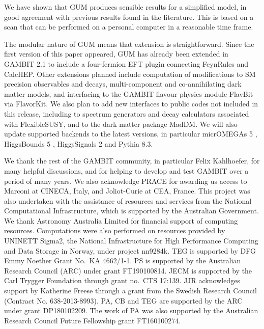 \documentclass[pdftex,twocolumn,epjc3_preprint,runningheads]{svjour3}
\renewcommand{\_}{\discretionary{\underscore}{}{\underscore}}
\newcommand{\gambit}{\textsf{GAMBIT}\xspace}
\newcommand{\flavbit}{\textsf{FlavBit}\xspace}
\newcommand{\GB}{\gambit}
\newcommand{\pythia}{\textsf{Pythia}\xspace}
\newcommand{\higgsbounds}{\textsf{HiggsBounds}\xspace}
\newcommand{\higgssignals}{\textsf{HiggsSignals}\xspace}
\newcommand{\mo}{\micromegas}
\newcommand{\micromegas}{\textsf{micrOMEGAs}\xspace}
\newcommand\FS{\FlexibleSUSY}
\newcommand\FlexibleSUSY{\textsf{FlexibleSUSY}\xspace}
\newcommand{\gum}{\textsf{GUM}\xspace}
\newcommand{\fr}{\textsf{FeynRules}\xspace}
\newcommand{\CH}{\textsf{CalcHEP}\xspace}
\newcommand{\mdm}{\textsf{MadDM}\xspace}
\begin{document}
We have shown that \gum produces sensible results for a simplified model, in good agreement with previous results found in the literature.  This is based on a scan that can be performed on a personal computer in a reasonable time frame.

The modular nature of \gum means that extension is straightforward.  Since the first version of this paper appeared, \gum has already been extended in \gambit 2.1 to include a four-fermion EFT plugin connecting \fr and \CH \cite{DMEFT}.  Other extensions planned include computation of modifications to SM precision observables and decays, multi-component and co-annihilating dark matter models, and interfacing to the \GB flavour physics module \flavbit via \textsf{FlavorKit}.  We also plan to add new interfaces to public codes not included in this release, including to spectrum generators and decay calculators associated with \FS, and to the dark matter package \mdm. We will also update supported backends to the latest versions, in particular \mo 5 \cite{Belanger:2018ccd}, \higgsbounds 5 \cite{Bechtle:2020pkv}, \higgssignals 2 \cite{Bechtle:2020uwn} and \pythia 8.3.


\begin{acknowledgements}
We thank the rest of the GAMBIT community, in particular Felix Kahlhoefer, for many helpful discussions, and for helping to develop and test \GB over a period of many years. We also acknowledge PRACE for awarding us access to Marconi at CINECA, Italy, and Joliot-Curie at CEA, France. This project was also undertaken with the assistance of resources and services from the National Computational Infrastructure, which is supported by the Australian Government. We thank Astronomy Australia Limited for financial support of computing resources. Computations were also performed on resources provided by UNINETT Sigma2, the National Infrastructure for High Performance Computing and Data Storage in Norway, under project nn9284k. TEG is supported by DFG Emmy Noether Grant No.~KA 4662/1-1. PS is supported by the Australian Research Council (ARC) under grant FT190100814. JECM is supported by the Carl Trygger Foundation through grant no.\ CTS 17:139. JJR acknowledges support by Katherine Freese through a grant from the Swedish Research Council (Contract No. 638-2013-8993). PA, CB and TEG are supported by the ARC under grant DP180102209.  The work of PA was also supported by the Australian Research Council Future Fellowship grant FT160100274.
\end{acknowledgements}
\end{document}
